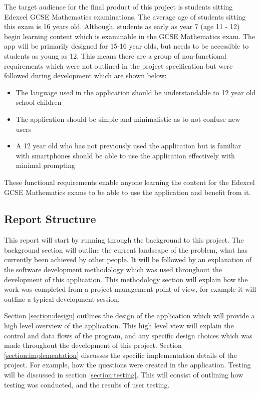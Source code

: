 \documentclass{article}
\begin{document}
The target audience for the final product of this project is students sitting Edexcel GCSE Mathematics examinations. The average age of students sitting this exam is 16 years old. Although, students as early as year 7 (age 11 - 12) begin learning content which is examinable in the GCSE Mathematics exam. The app will be primarily designed for 15-16 year olds, but needs to be accessible to students as young as 12. This means there are a group of non-functional requirements which were not outlined in the project specification but were followed during development which are shown below: 

\begin{itemize}
	\item The language used in the application should be understandable to 12 year old school children
	\item The application should be simple and minimalistic as to not confuse new users
	\item A 12 year old who has not previously used the application but is familiar with smartphones should be able to use the application effectively with minimal prompting
\end{itemize}

These functional requirements enable anyone learning the content for the Edexcel GCSE Mathematics exams to be able to use the application and benefit from it.


\subsection{Report Structure}

This report will start by running through the background to this project. The background section will outline the current landscape of the problem, what has currently been achieved by other people. It will be followed by an explanation of the software development methodology which was used throughout the development of this application. This methodology section will explain how the work was completed from a project management point of view, for example it will outline a typical development session. \par

Section \ref{section:design} outlines the design of the application which will provide a high level overview of the application. This high level view will explain the control and data flows of the program, and any specific design choices which was made throughout the development of this project. Section \ref{section:implementation} discusses the specific implementation details of the project. For example, how the questions were created in the application. Testing will be discussed in section \ref{section:testing}. This will consist of outlining how testing was conducted, and the results of user testing. \par
\end{document}
